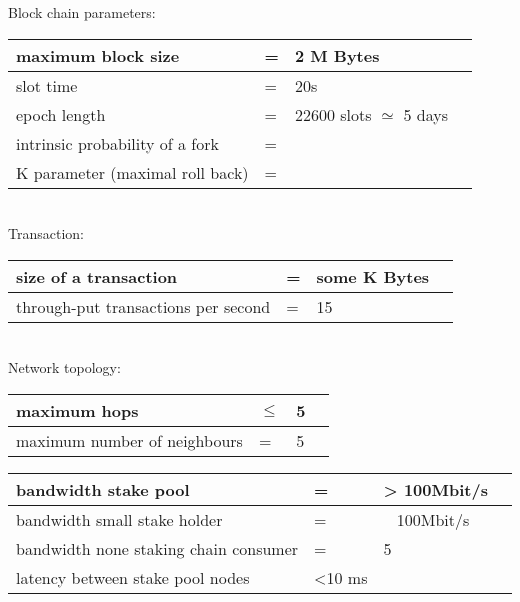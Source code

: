 \documentclass{report}
\theoremstyle{definition}{
  \newtheorem{lemma}{Lemma}[section] %
  \newtheorem{definition}[lemma]{Definition}
}
\theoremstyle{theorem}{
  \newtheorem{invariant}[lemma]{Invariant}
  \newtheorem{proofobligation}[lemma]{Proof Obligation}
}
\numberwithin{equation}{lemma}
\begin{document}
Block chain parameters:\\
\begin{tabular}{p{4cm}p{1cm}p{6cm}p{1cm}} \hline
  maximum block size   & = & 2 M Bytes                                    &  \\ \hline
  slot time            & = & 20s                                          &  \\ \hline
  epoch length         & = & 22600 slots $\simeq$ 5 days                  &  \\ \hline
  intrinsic probability of a fork & = &                                   &  \\ \hline
  K parameter (maximal roll back) & = &                                   &  \\ \hline
\end{tabular}\\

Transaction:\\
\begin{tabular}{p{4cm}p{1cm}p{6cm}p{1cm}} \hline
  size of a transaction                & = &  some K Bytes               &  \\ \hline
  through-put transactions per second   & = &  15                        &  \\ \hline
\end{tabular}\\

Network topology:\\
\begin{tabular}{p{4cm}p{1cm}p{6cm}p{1cm}} \hline
  maximum hops                         & $\le$ &  5                         &  \\ \hline
  maximum number of neighbours          & = &  5                         &  \\ \hline
\end{tabular}

\begin{tabular}{p{4cm}p{1cm}p{6cm}p{1cm}} \hline
  bandwidth stake pool                             & = &  > 100Mbit/s             &  \\ \hline
  bandwidth small stake holder                    & = &  ~ 100Mbit/s             &  \\ \hline
  bandwidth none staking chain consumer          & = &  5                       &  \\ \hline
  latency  between stake pool nodes                & <10 ms                       &  \\ \hline
\end{tabular}\\
\end{document}
